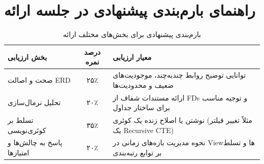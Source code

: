 \documentclass[12pt]{article}
\begin{document}
\newpage

\section{راهنمای بارم‌بندی پیشنهادی در جلسه ارائه}
\begin{table}[h!]
\centering
\caption{بارم‌بندی پیشنهادی برای بخش‌های مختلف ارائه}
\vspace{0.3cm}
\begin{tabular}{lcl}
\toprule
\textbf{بخش ارزیابی} & \textbf{درصد نمره} & \textbf{معیار ارزیابی} \\
\midrule
صحت و اصالت ERD & ۲۵٪ & توانایی توضیح روابط چندبه‌چند، موجودیت‌های ضعیف و محدودیت‌ها \\
تحلیل نرمال‌سازی & ۲۰٪ & ارائه مستندات شفاف از FDs و توجیه مناسب برای ساختار جداول \\
تسلط بر کوئری‌نویسی & ۳۵٪ & نوشتن یا اصلاح زنده یک کوئری (مثلاً تغییر فیلتر یک Recursive CTE) \\
پاسخ به چالش‌ها و امتیازها & ۲۰٪ & نحوه مدیریت بازه‌های زمانی در Viewها و تسلط بر توابع رتبه‌بندی \\
\bottomrule
\end{tabular}
\end{table}
\end{document}
